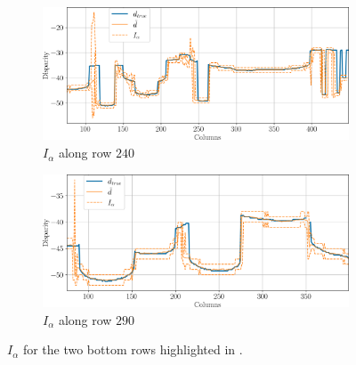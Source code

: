 \begin{figure}
    \centering
    \begin{subfigure}[t]{\linewidth}
        \centering
        \includegraphics[width=\linewidth]{Images/Chap_5/intervals_ambiguous_area_row_240_1.png}
        \caption{$I_\alpha$ along row $240$}
        \label{fig:intervals_ambiguous_row_240_no_reg}
    \end{subfigure}\hfill
    \begin{subfigure}[t]{\linewidth}
        \centering
        \includegraphics[width=\linewidth]{Images/Chap_5/intervals_ambiguous_area_row_290_1.png}
        \caption{$I_\alpha$ along row $290$}
        \label{fig:intervals_ambiguous_row_290_no_reg}
    \end{subfigure}
    \caption{$I_\alpha$ for the two bottom rows highlighted in .}
    \label{fig:intervals_ambiguous_row_240_290}
\end{figure}

